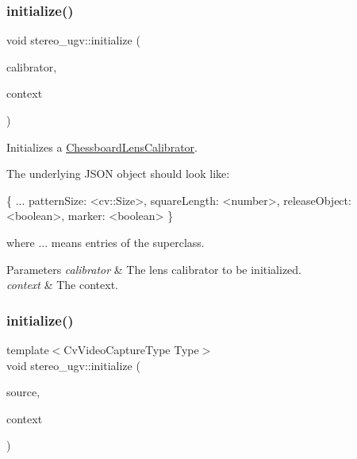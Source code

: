 \subsubsection{\texorpdfstring{initialize()}{initialize()}\hspace{0.1cm}{\footnotesize\ttfamily [8/9]}}
{\footnotesize\ttfamily void stereo\+\_\+ugv\+::initialize (\begin{DoxyParamCaption}\item[{\hyperlink{classstereo__ugv_1_1ChessboardLensCalibrator}{Chessboard\+Lens\+Calibrator} $\ast$}]{calibrator,  }\item[{const \hyperlink{classstereo__ugv_1_1Context}{Context} \&}]{context }\end{DoxyParamCaption})}



Initializes a \hyperlink{classstereo__ugv_1_1ChessboardLensCalibrator}{Chessboard\+Lens\+Calibrator}. 

The underlying J\+S\+ON object should look like\+: 
\begin{DoxyCode}
\{
  ...
  patternSize: <cv::Size>,
  squareLength: <number>,
  releaseObject: <\textcolor{keywordtype}{boolean}>,
  marker: <\textcolor{keywordtype}{boolean}>
\}
\end{DoxyCode}
 where ... means entries of the superclass. 
\begin{DoxyParams}{Parameters}
{\em calibrator} & The lens calibrator to be initialized. \\
\hline
{\em context} & The context. \\
\hline
\end{DoxyParams}
\mbox{\label{namespacestereo__ugv_acaec0936792769b5d676773f7d4070cd}} 
\subsubsection{\texorpdfstring{initialize()}{initialize()}\hspace{0.1cm}{\footnotesize\ttfamily [9/9]}}
{\footnotesize\ttfamily template$<$Cv\+Video\+Capture\+Type Type$>$ \\
void stereo\+\_\+ugv\+::initialize (\begin{DoxyParamCaption}\item[{\hyperlink{classstereo__ugv_1_1CvVideoCaptureImageSource}{Cv\+Video\+Capture\+Image\+Source}$<$ Type $>$ $\ast$}]{source,  }\item[{const \hyperlink{classstereo__ugv_1_1Context}{Context} \&}]{context }\end{DoxyParamCaption})\hspace{0.3cm}{\ttfamily [inline]}}



